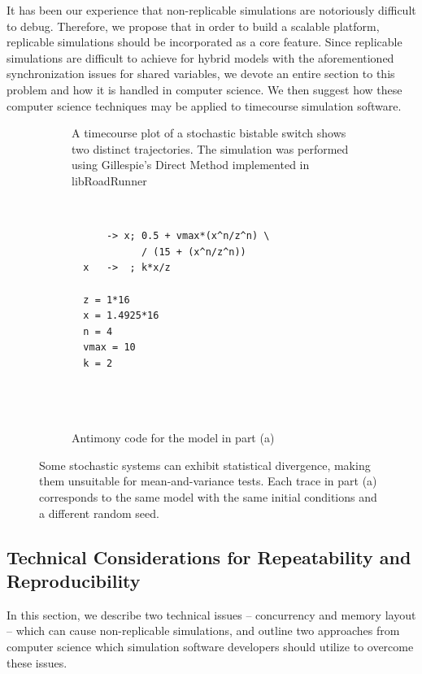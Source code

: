 \documentclass[journal,transmag,twoside]{IEEEtran}
\begin{document}
It has been our experience that non-replicable simulations are notoriously difficult to debug. Therefore, we propose that in order to build a scalable platform, replicable simulations should be incorporated as a core feature. Since replicable simulations are difficult to achieve for hybrid models with the aforementioned synchronization issues for shared variables, we devote an entire section to this problem and how it is handled in computer science. We then suggest how these computer science techniques may be applied to timecourse simulation software.

\begin{figure}[!t]
  \centering
  \begin{subfigure}[t]{0.5\textwidth}
    \centering
    
    \caption{A timecourse plot of a stochastic bistable switch shows two distinct trajectories. The simulation was performed using Gillespie's Direct Method \cite{gillespie1977exact} implemented in libRoadRunner \cite{Somogyi17062015}}
  \end{subfigure}%
  ~
  \begin{subfigure}[t]{0.5\textwidth}
    \centering
    \begin{BVerbatim}
      -> x; 0.5 + vmax*(x^n/z^n) \
            / (15 + (x^n/z^n))
  x   ->  ; k*x/z

  z = 1*16
  x = 1.4925*16
  n = 4
  vmax = 10
  k = 2




    \end{BVerbatim}
    \caption{Antimony code for the model in part (a)}
  \end{subfigure}
  \caption{Some stochastic systems can exhibit statistical divergence, making them unsuitable for mean-and-variance tests. Each trace in part (a) corresponds to the same model with the same initial conditions and a different random seed.}
  \label{fig_bistable_plot}
\end{figure}

\subsection{Technical Considerations for Repeatability and Reproducibility}

In this section, we describe two technical issues -- concurrency and memory layout -- which can 
cause non-replicable simulations, and outline two approaches from computer science which simulation software developers should utilize to overcome these issues.
\end{document}
